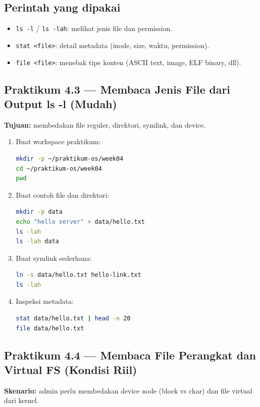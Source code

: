 \subsection*{Perintah yang dipakai}
\begin{itemize}
    \item \texttt{ls -l} / \texttt{ls -lah}: melihat jenis file dan permission.
    \item \texttt{stat <file>}: detail metadata (inode, size, waktu, permission).
    \item \texttt{file <file>}: menebak tipe konten (ASCII text, image, ELF binary, dll).
\end{itemize}

\subsection*{Praktikum 4.3 --- Membaca Jenis File dari Output ls -l (Mudah)}
\textbf{Tujuan:} membedakan file reguler, direktori, symlink, dan device.

\begin{enumerate}
    \item Buat workspace praktikum:
\begin{lstlisting}[language=bash, caption={Membuat workspace bab ini}]
mkdir -p ~/praktikum-os/week04
cd ~/praktikum-os/week04
pwd
\end{lstlisting}

    \item Buat contoh file dan direktori:
\begin{lstlisting}[language=bash, caption={Membuat file reguler dan direktori contoh}]
mkdir -p data
echo "hello server" > data/hello.txt
ls -lah
ls -lah data
\end{lstlisting}

    \item Buat symlink sederhana:
\begin{lstlisting}[language=bash, caption={Membuat symlink}]
ln -s data/hello.txt hello-link.txt
ls -lah
\end{lstlisting}

    \item Inspeksi metadata:
\begin{lstlisting}[language=bash, caption={Menginspeksi metadata file}]
stat data/hello.txt | head -n 20
file data/hello.txt
\end{lstlisting}
\end{enumerate}

\subsection*{Praktikum 4.4 --- Membaca File Perangkat dan Virtual FS (Kondisi Riil)}
\textbf{Skenario:} admin perlu membedakan device node (block vs char) dan file virtual dari kernel.

